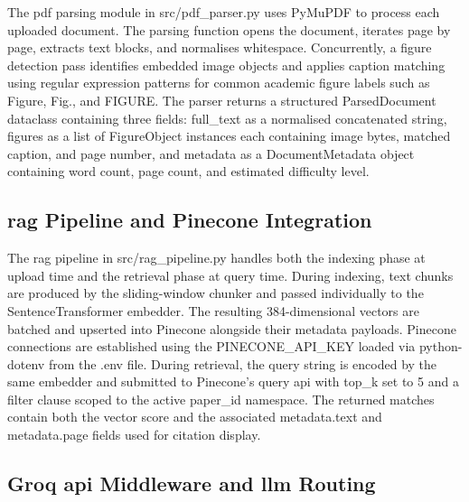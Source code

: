 The \gls{pdf} parsing module in src/pdf\_parser.py uses PyMuPDF to process each uploaded document. The parsing function opens the document, iterates page by page, extracts text blocks, and normalises whitespace. Concurrently, a figure detection pass identifies embedded image objects and applies caption matching using regular expression patterns for common academic figure labels such as Figure, Fig., and FIGURE.
\newline \newline The parser returns a structured ParsedDocument dataclass containing three fields: full\_text as a normalised concatenated string, figures as a list of FigureObject instances each containing image bytes, matched caption, and page number, and metadata as a DocumentMetadata object containing word count, page count, and estimated difficulty level.

\subsection{\gls{rag} Pipeline and Pinecone Integration}

The \gls{rag} pipeline in src/rag\_pipeline.py handles both the indexing phase at upload time and the retrieval phase at query time.
\newline \newline During indexing, text chunks are produced by the sliding-window chunker and passed individually to the SentenceTransformer embedder. The resulting 384-dimensional vectors are batched and upserted into Pinecone alongside their metadata payloads. Pinecone connections are established using the PINECONE\_API\_KEY loaded via python-dotenv from the .env file.
\newline \newline During retrieval, the query string is encoded by the same embedder and submitted to Pinecone's query \gls{api} with top\_k set to 5 and a filter clause scoped to the active paper\_id namespace. The returned matches contain both the vector score and the associated metadata.text and metadata.page fields used for citation display.

\subsection{Groq \gls{api} Middleware and \gls{llm} Routing}

